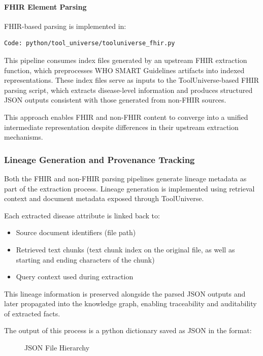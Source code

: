 \paragraph{FHIR Element Parsing}
FHIR-based parsing is implemented in:
\begin{verbatim}
Code: python/tool_universe/tooluniverse_fhir.py
\end{verbatim}

This pipeline consumes index files generated by an upstream FHIR extraction function, which preprocesses WHO SMART Guidelines artifacts into indexed representations. These index files serve as inputs to the ToolUniverse-based FHIR parsing script, which extracts disease-level information and produces structured JSON outputs consistent with those generated from non-FHIR sources.

This approach enables FHIR and non-FHIR content to converge into a unified intermediate representation despite differences in their upstream extraction mechanisms.

\subsubsection{Lineage Generation and Provenance Tracking}

Both the FHIR and non-FHIR parsing pipelines generate lineage metadata as part of the extraction process. Lineage generation is implemented using retrieval context and document metadata exposed through ToolUniverse.

Each extracted disease attribute is linked back to:
\begin{itemize}
    \item Source document identifiers (file path)
    \item Retrieved text chunks (text chunk index on the original file, as well as starting and ending characters of the chunk)
    \item Query context used during extraction
\end{itemize}

This lineage information is preserved alongside the parsed JSON outputs and later propagated into the knowledge graph, enabling traceability and auditability of extracted facts.

The output of this process is a python dictionary saved as JSON in the format:

\begin{figure}[H]
\caption{JSON File Hierarchy}
\end{figure}


